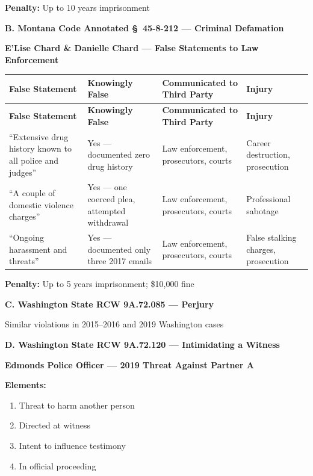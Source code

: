 \documentclass[11pt, letterpaper]{article}
\newcommand{\subsectiontitle}[1]{\vspace{0.15in}\noindent\textcolor{NavyBlue}{\textbf{#1}}\vspace{0.05in}}
\begin{document}
\textbf{Penalty:} Up to 10 years imprisonment

\subsectiontitle{B. Montana Code Annotated \S\ 45-8-212 --- Criminal Defamation}

\textbf{E'Lise Chard \& Danielle Chard --- False Statements to Law Enforcement}

\begin{center}
\begin{longtable}{|p{1.5in}|p{1.0in}|p{1.4in}|p{1.6in}|}
\hline
\textbf{False Statement} & \textbf{Knowingly False} & \textbf{Communicated to Third Party} & \textbf{Injury} \\
\hline
\endfirsthead
\hline
\textbf{False Statement} & \textbf{Knowingly False} & \textbf{Communicated to Third Party} & \textbf{Injury} \\
\hline
\endhead
``Extensive drug history known to all police and judges'' & Yes --- documented zero drug history & Law enforcement, prosecutors, courts & Career destruction, prosecution \\
\hline
``A couple of domestic violence charges'' & Yes --- one coerced plea, attempted withdrawal & Law enforcement, prosecutors, courts & Professional sabotage \\
\hline
``Ongoing harassment and threats'' & Yes --- documented only three 2017 emails & Law enforcement, prosecutors, courts & False stalking charges, prosecution \\
\hline
\end{longtable}
\end{center}

\textbf{Penalty:} Up to 5 years imprisonment; \$10,000 fine

\subsectiontitle{C. Washington State RCW 9A.72.085 --- Perjury}

Similar violations in 2015--2016 and 2019 Washington cases

\subsectiontitle{D. Washington State RCW 9A.72.120 --- Intimidating a Witness}

\textbf{Edmonds Police Officer --- 2019 Threat Against Partner A}

\textbf{Elements:}
\begin{enumerate}[leftmargin=*,itemsep=2pt]
    \item Threat to harm another person
    \item Directed at witness
    \item Intent to influence testimony
    \item In official proceeding
\end{enumerate}
\end{document}
